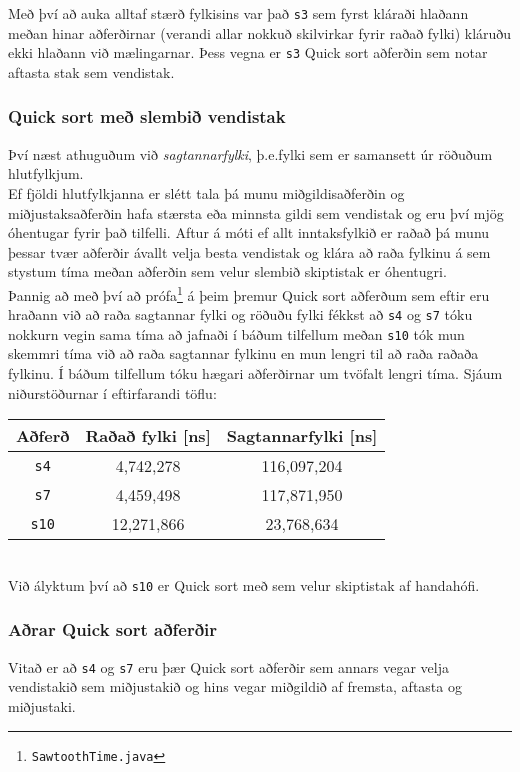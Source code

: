 \documentclass[a4paper,oneside]{article}
\begin{document}
\noindent Með því að auka alltaf stærð fylkisins var það \texttt{s3} sem fyrst kláraði hlaðann meðan hinar aðferðirnar (verandi allar nokkuð skilvirkar fyrir raðað fylki) kláruðu ekki hlaðann við mælingarnar. Þess vegna er \texttt{s3} Quick sort aðferðin sem notar aftasta stak sem vendistak.

\subsubsection{Quick sort með slembið vendistak}
Því næst athuguðum við \emph{sagtannarfylki}, þ.e.\@ fylki sem er samansett úr röðuðum hlutfylkjum. \\

\noindent Ef fjöldi hlutfylkjanna er slétt tala þá munu miðgildisaðferðin og miðjustaksaðferðin hafa stærsta eða minnsta gildi sem vendistak og eru því mjög óhentugar fyrir það tilfelli. Aftur á móti ef allt inntaksfylkið er raðað þá munu þessar tvær aðferðir ávallt velja besta vendistak og klára að raða fylkinu á sem stystum tíma meðan aðferðin sem velur slembið skiptistak er óhentugri. \\

\noindent Þannig að með því að prófa\footnote{\texttt{SawtoothTime.java}} á þeim þremur Quick sort aðferðum sem eftir eru hraðann við að raða sagtannar fylki og röðuðu fylki fékkst að \texttt{s4} og \texttt{s7} tóku nokkurn vegin sama tíma að jafnaði í báðum tilfellum meðan \texttt{s10} tók mun skemmri tíma við að raða sagtannar fylkinu en mun lengri til að raða raðaða fylkinu. Í báðum tilfellum tóku hægari aðferðirnar um tvöfalt lengri tíma. Sjáum niðurstöðurnar í eftirfarandi töflu: \\

\begin{tabular}{c|c|c}

Aðferð & Raðað fylki [ns] & Sagtannarfylki [ns] \\ \hline
\texttt{s4} &   4,742,278   &   116,097,204\\
\texttt{s7} &   4,459,498   &   117,871,950\\
\texttt{s10} &  12,271,866  &   23,768,634\\
\end{tabular} \\

\noindent Við ályktum því að \texttt{s10} er Quick sort með sem velur skiptistak af handahófi. 

\subsubsection{Aðrar Quick sort aðferðir}
Vitað er að \texttt{s4} og \texttt{s7} eru þær Quick sort aðferðir sem annars vegar velja vendistakið sem miðjustakið og hins vegar miðgildið af fremsta, aftasta og miðjustaki. \\
\end{document}
